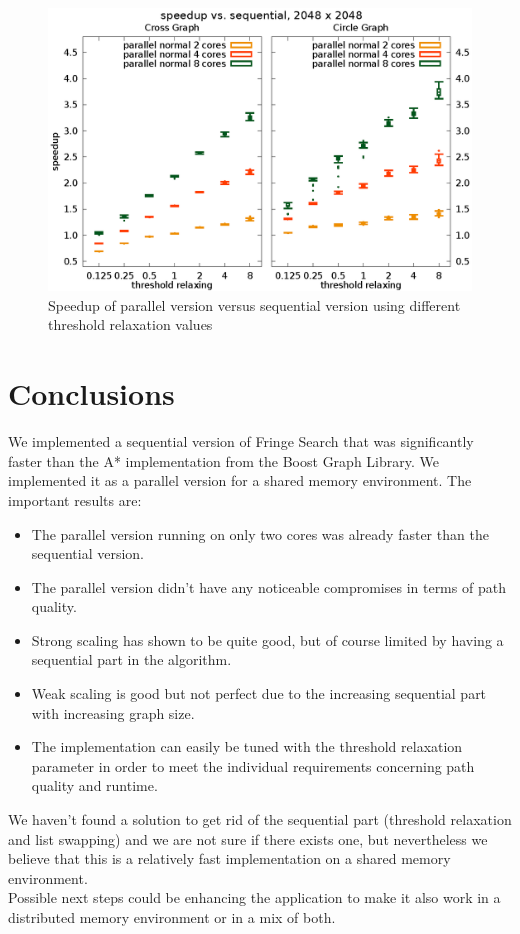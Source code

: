\documentclass[letterpaper]{article}
\begin{document}
\begin{figure}[h]\centering
  \includegraphics[scale=0.558]{speedup_threshold.eps}
  \caption{Speedup of parallel version versus sequential version using different threshold relaxation values\label{fig:speedup_thresh}}
\end{figure}


\section{Conclusions}

We implemented a sequential version of Fringe Search that was significantly faster than the A* implementation from the Boost Graph Library. We implemented it as a parallel version for a shared memory environment. The important results are:
\begin{itemize}
\item The parallel version running on only two cores was already faster than the sequential version.
\item The parallel version didn't have any noticeable compromises in terms of path quality.
\item Strong scaling has shown to be quite good, but of course limited by having a sequential part in the algorithm.
\item Weak scaling is good but not perfect due to the increasing sequential part with increasing graph size.
\item The implementation can easily be tuned with the threshold relaxation parameter in order to meet the individual requirements concerning path quality and runtime.
\end{itemize}
We haven't found a solution to get rid of the sequential part (threshold relaxation and list swapping) and we are not sure if there exists one, but nevertheless we believe that this is a relatively fast implementation on a shared memory environment.\\
Possible next steps could be enhancing the application to make it also work in a distributed memory environment or in a mix of both.





\end{document}

